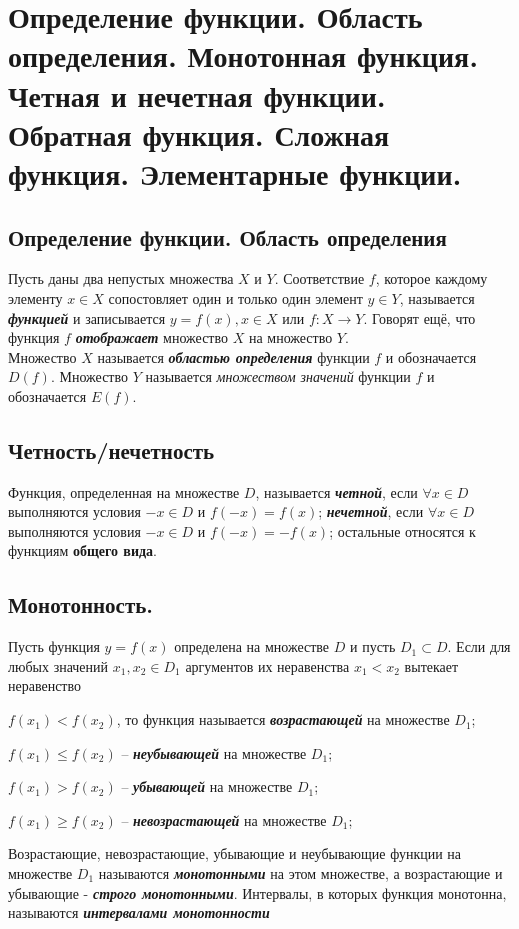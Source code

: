 \documentclass[12pt, fleqn]{article}
\begin{document}
	\section{Определение функции. Область определения. Монотонная функция. Четная и  нечетная функции. Обратная функция. Сложная функция. Элементарные функции.
	}
	\subsection{Определение функции. Область определения}
	Пусть даны два непустых множества $X$ и $Y$. Соответствие $f$, которое каждому элементу $x \in X$ сопостовляет один и только один элемент $y \in Y$, называется \textbf{\textit{функцией}} и записывается $y=f(x), x \in X$ или $f\colon  X \rightarrow Y$. Говорят ещё, что функция $f$ \textbf{\textit{отображает}} множество $X$ на множество $Y$.\\
	Множество $X$ называется \textit{\textbf{областью определения}} функции $f$ и обозначается $D(f)$. Множество $Y$ называется \textit{множеством значений} функции $f$ и обозначается $E(f)$.
	\subsection{Четность/нечетность}
	Функция, определенная на множестве $D$, называется \textbf{\textit{четной}}, если $\forall x \in D$ выполняются условия $-x \in D$ и $f(-x)=f(x)$; \textbf{\textit{нечетной}}, если $\forall x \in D$ выполняются условия $-x \in D$ и $f(-x)=-f(x)$; остальные относятся к функциям \textbf{общего вида}.
	\subsection{Монотонность.}
	Пусть функция $y=f(x)$ определена на множестве $D$ и пусть $D_1\subset D$. Если для любых значений $x_1, x_2 \in D_1$ аргументов их неравенства $x_1 < x_2 $ вытекает неравенство
	\begin{description}
		\item $f(x_1) < f(x_2)$, то функция называется \textbf{\textit{возрастающей}} на множестве $D_1$; 
		\item $f(x_1)\leq f(x_2)$ -- \textbf{\textit{неубывающей}} на множестве $D_1$;
		\item $f(x_1)>f(x_2)$ -- \textbf{\textit{убывающей}} на множестве $D_1$;
		\item $f(x_1) \geq f(x_2)$ -- \textbf{\textit{невозрастающей}} на множестве $D_1$;
	\end{description}
	Возрастающие, невозрастающие, убывающие и неубывающие функции на множестве $D_1$ называются \textbf{\textit{монотонными}} на этом множестве, а возрастающие и убывающие - \textbf{\textit{строго монотонными}}. Интервалы, в которых функция монотонна, называются \textbf{\textit{интервалами монотонности}}
\end{document}
